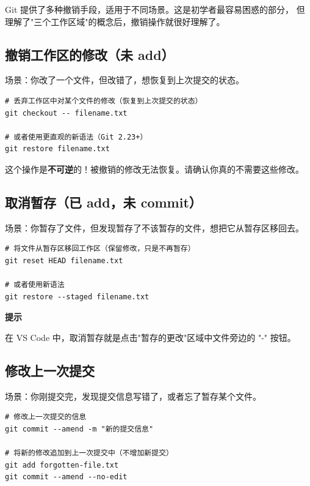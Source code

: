 \documentclass[12pt,a4paper,openany]{ctexbook}
\newenvironment{tipbox}{%
  \medskip
  \noindent\textbf{\faLightbulb\; 提示}
  \smallskip
}{%
  \medskip
}
\begin{document}
Git 提供了多种撤销手段，适用于不同场景。这是初学者最容易困惑的部分，
但理解了"三个工作区域"的概念后，撤销操作就很好理解了。

\subsection{撤销工作区的修改（未 add）}

场景：你改了一个文件，但改错了，想恢复到上次提交的状态。

\begin{lstlisting}[style=shell]
# 丢弃工作区中对某个文件的修改（恢复到上次提交的状态）
git checkout -- filename.txt

# 或者使用更直观的新语法（Git 2.23+）
git restore filename.txt
\end{lstlisting}

\begin{warnbox}
这个操作是\textbf{不可逆}的！被撤销的修改无法恢复。请确认你真的不需要这些修改。
\end{warnbox}

\subsection{取消暂存（已 add，未 commit）}

场景：你暂存了文件，但发现暂存了不该暂存的文件，想把它从暂存区移回去。

\begin{lstlisting}[style=shell]
# 将文件从暂存区移回工作区（保留修改，只是不再暂存）
git reset HEAD filename.txt

# 或者使用新语法
git restore --staged filename.txt
\end{lstlisting}

\begin{tipbox}
在 VS Code 中，取消暂存就是点击"暂存的更改"区域中文件旁边的 "-" 按钮。
\end{tipbox}

\subsection{修改上一次提交}

场景：你刚提交完，发现提交信息写错了，或者忘了暂存某个文件。

\begin{lstlisting}[style=shell]
# 修改上一次提交的信息
git commit --amend -m "新的提交信息"

# 将新的修改追加到上一次提交中（不增加新提交）
git add forgotten-file.txt
git commit --amend --no-edit
\end{lstlisting}
\end{document}
